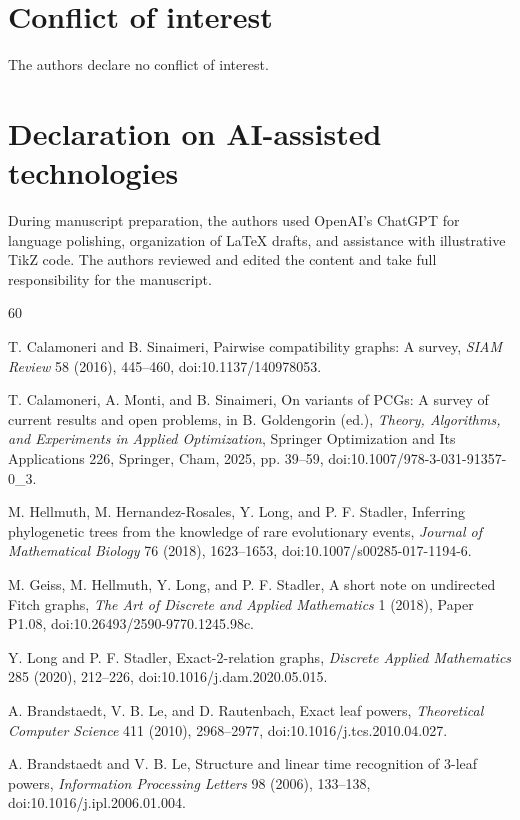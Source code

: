 \documentclass[11pt]{article}
\theoremstyle{definition}
\begin{document}
\section*{Conflict of interest}
The authors declare no conflict of interest.

\section*{Declaration on AI-assisted technologies}
During manuscript preparation, the authors used OpenAI's ChatGPT for language polishing, organization of LaTeX drafts, and assistance with illustrative TikZ code.  The authors reviewed and edited the content and take full responsibility for the manuscript.

\begin{thebibliography}{60}

T. Calamoneri and B. Sinaimeri,
Pairwise compatibility graphs: A survey,
\emph{SIAM Review} 58 (2016), 445--460,
doi:10.1137/140978053.

T. Calamoneri, A. Monti, and B. Sinaimeri,
On variants of PCGs: A survey of current results and open problems,
in B. Goldengorin (ed.), \emph{Theory, Algorithms, and Experiments in Applied Optimization},
Springer Optimization and Its Applications 226, Springer, Cham, 2025, pp. 39--59,
doi:10.1007/978-3-031-91357-0\_3.

M. Hellmuth, M. Hernandez-Rosales, Y. Long, and P. F. Stadler,
Inferring phylogenetic trees from the knowledge of rare evolutionary events,
\emph{Journal of Mathematical Biology} 76 (2018), 1623--1653,
doi:10.1007/s00285-017-1194-6.

M. Geiss, M. Hellmuth, Y. Long, and P. F. Stadler,
A short note on undirected Fitch graphs,
\emph{The Art of Discrete and Applied Mathematics} 1 (2018), Paper P1.08,
doi:10.26493/2590-9770.1245.98c.

Y. Long and P. F. Stadler,
Exact-2-relation graphs,
\emph{Discrete Applied Mathematics} 285 (2020), 212--226,
doi:10.1016/j.dam.2020.05.015.

A. Brandstaedt, V. B. Le, and D. Rautenbach,
Exact leaf powers,
\emph{Theoretical Computer Science} 411 (2010), 2968--2977,
doi:10.1016/j.tcs.2010.04.027.

A. Brandstaedt and V. B. Le,
Structure and linear time recognition of 3-leaf powers,
\emph{Information Processing Letters} 98 (2006), 133--138,
doi:10.1016/j.ipl.2006.01.004.


\end{thebibliography}
\end{document}
